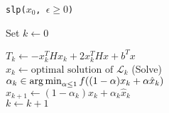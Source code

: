 \begin{algorithm}[ht!]
\caption{\texttt{slp($x_0$, $\epsilon \ge 0$)}}
\label{alg:iter}
\SetAlgoVlined
\DontPrintSemicolon
Set $k \leftarrow 0$\;

 {
    $T_k \leftarrow - x_k^THx_k + 2x_k^THx + b^Tx$ \\
    $\hat{x}_k \leftarrow \textrm{optimal solution of } \mathcal{L}_k$ (Solve) \\
    $\alpha_k \in \operatorname*{arg\,min}_{\alpha \leq 1} f((1-\alpha) x_k + \alpha \hat{x}_k)$ \\
    $x_{k+1} \leftarrow (1-\alpha_k) x_k + \alpha_k\hat{x}_k$ \\
    $k \leftarrow k +1$
}
\end{algorithm}
